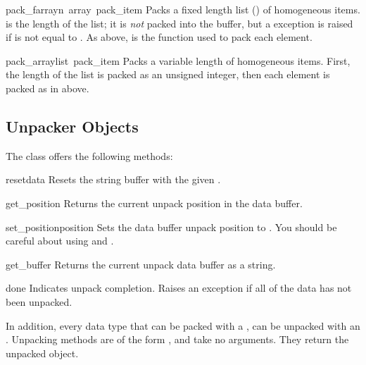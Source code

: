 \begin{funcdesc}{pack_farray}{n\, array\, pack_item}
Packs a fixed length list () of homogeneous items.  
is the length of the list; it is \emph{not} packed into the buffer,
but a  exception is raised if
 is not equal to .  As above,
 is the function used to pack each element.
\end{funcdesc}

\begin{funcdesc}{pack_array}{list\, pack_item}
Packs a variable length  of homogeneous items.  First, the
length of the list is packed as an unsigned integer, then each element
is packed as in  above.
\end{funcdesc}

\subsection{Unpacker Objects}
\label{xdr-unpacker-objects}

The  class offers the following methods:

\begin{funcdesc}{reset}{data}
Resets the string buffer with the given .
\end{funcdesc}

\begin{funcdesc}{get_position}{}
Returns the current unpack position in the data buffer.
\end{funcdesc}

\begin{funcdesc}{set_position}{position}
Sets the data buffer unpack position to .  You should be
careful about using  and .
\end{funcdesc}

\begin{funcdesc}{get_buffer}{}
Returns the current unpack data buffer as a string.
\end{funcdesc}

\begin{funcdesc}{done}{}
Indicates unpack completion.  Raises an  exception
if all of the data has not been unpacked.
\end{funcdesc}

In addition, every data type that can be packed with a ,
can be unpacked with an .  Unpacking methods are of the
form , and take no arguments.  They return the
unpacked object.

